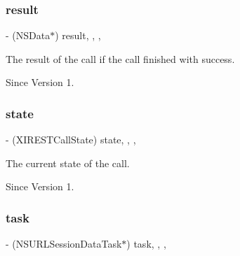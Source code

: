 \subsubsection{\texorpdfstring{result}{result}}
{\footnotesize\ttfamily -\/ (N\+S\+Data$\ast$) result\hspace{0.3cm}{\ttfamily [read]}, {\ttfamily [write]}, {\ttfamily [nonatomic]}, {\ttfamily [strong]}}



The result of the call if the call finished with success. 

\begin{DoxySince}{Since}
Version 1. 
\end{DoxySince}
\hypertarget{category_x_i_simple_r_e_s_t_call_07_08_a6364ccaf1317a77df115ede73206cf24}{}\label{category_x_i_simple_r_e_s_t_call_07_08_a6364ccaf1317a77df115ede73206cf24} 
\subsubsection{\texorpdfstring{state}{state}}
{\footnotesize\ttfamily -\/ (X\+I\+R\+E\+S\+T\+Call\+State) state\hspace{0.3cm}{\ttfamily [read]}, {\ttfamily [write]}, {\ttfamily [nonatomic]}, {\ttfamily [assign]}}



The current state of the call. 

\begin{DoxySince}{Since}
Version 1. 
\end{DoxySince}
\hypertarget{category_x_i_simple_r_e_s_t_call_07_08_a62e37bff2f70f011fea6c61b854c6b17}{}\label{category_x_i_simple_r_e_s_t_call_07_08_a62e37bff2f70f011fea6c61b854c6b17} 
\subsubsection{\texorpdfstring{task}{task}}
{\footnotesize\ttfamily -\/ (N\+S\+U\+R\+L\+Session\+Data\+Task$\ast$) task\hspace{0.3cm}{\ttfamily [read]}, {\ttfamily [write]}, {\ttfamily [nonatomic]}, {\ttfamily [strong]}}



